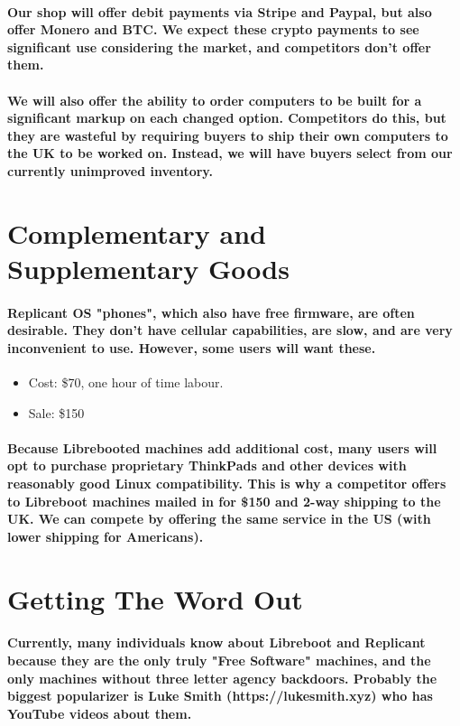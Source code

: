 \documentclass{article}
\begin{document}
\paragraph{Our shop will offer debit payments via Stripe and Paypal, but also offer
Monero and BTC. We expect these crypto payments to see significant use
considering the market, and competitors don't offer them.}

\paragraph{We will also offer the ability to order computers to be built for a
significant markup on each changed option. Competitors do this, but they
are wasteful by requiring buyers to ship their own computers to the UK
to be worked on. Instead, we will have buyers select from our currently
unimproved inventory.}

\section{Complementary and Supplementary Goods}
\paragraph{Replicant OS "phones", which also have free firmware, are often
desirable. They don't have cellular capabilities, are slow, and are very
inconvenient to use. However, some users will want these.}
\begin{itemize}
    \item \small Cost: \$70, one hour of time labour.
    \item \small Sale: \$150 \normalsize
\end{itemize}

\paragraph{Because Librebooted machines add additional cost, many users will opt
to purchase proprietary ThinkPads and other devices with reasonably good
Linux compatibility. This is why a competitor offers to Libreboot machines
mailed in for \$150 and 2-way shipping to the UK. We can compete by
offering the same service in the US (with lower shipping for Americans).}

\section{Getting The Word Out}
\paragraph{Currently, many individuals know about Libreboot and Replicant because
they are the only truly "Free Software" machines, and the only machines
without three letter agency backdoors. Probably the biggest popularizer
is Luke Smith (https://lukesmith.xyz) who has YouTube videos about them.}
\end{document}
